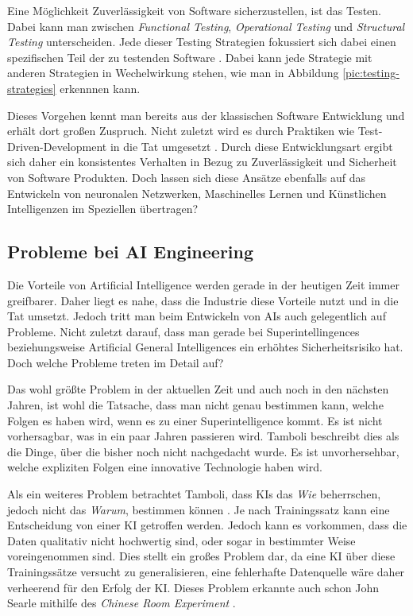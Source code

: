         Eine Möglichkeit Zuverlässigkeit von Software sicherzustellen, ist das Testen. Dabei kann man zwischen
        \textit{Functional Testing}, \textit{Operational Testing} und \textit{Structural Testing} unterscheiden.
        Jede dieser Testing Strategien fokussiert sich dabei einen spezifischen Teil der zu testenden Software
        \cite[s. 26]{bertolino2019}. Dabei kann jede Strategie mit anderen Strategien in Wechelwirkung stehen, wie man
        in Abbildung \ref{pic:testing-strategies} erkennnen kann.

        Dieses Vorgehen kennt man bereits aus der klassischen Software Entwicklung und erhält dort großen Zuspruch.
        Nicht zuletzt wird es durch Praktiken wie Test-Driven-Development in die Tat umgesetzt \cite[s. 403]{Kollanus2010}.
        Durch diese Entwicklungsart ergibt sich daher ein konsistentes Verhalten in Bezug zu Zuverlässigkeit und
        Sicherheit von Software Produkten. Doch lassen sich diese Ansätze ebenfalls auf das Entwickeln von
        neuronalen Netzwerken, Maschinelles Lernen und Künstlichen Intelligenzen im Speziellen übertragen?

        \subsection{Probleme bei AI Engineering}
        Die Vorteile von Artificial Intelligence werden gerade in der heutigen Zeit immer greifbarer. Daher liegt es
        nahe, dass die Industrie diese Vorteile nutzt und in die Tat umsetzt. Jedoch tritt man beim Entwickeln von AIs
        auch gelegentlich auf Probleme. Nicht zuletzt darauf, dass man gerade bei Superintellingences beziehungsweise
        Artificial General Intelligences ein erhöhtes Sicherheitsrisiko hat. Doch welche Probleme treten im Detail auf?

        Das wohl größte Problem in der aktuellen Zeit und auch noch in den nächsten Jahren, ist wohl die Tatsache, dass
        man nicht genau bestimmen kann, welche Folgen es haben wird, wenn es zu einer Superintelligence kommt.
        \cite[s. 21]{Tamboli2019} Es ist nicht vorhersagbar, was in ein paar Jahren passieren wird. Tamboli beschreibt
        dies als die Dinge, über die bisher noch nicht nachgedacht wurde. Es ist unvorhersehbar, welche expliziten Folgen
        eine innovative Technologie haben wird.

        Als ein weiteres Problem betrachtet Tamboli, dass KIs das \textit{Wie} beherrschen, jedoch nicht das
        \textit{Warum}, bestimmen können \cite[s. 24]{Tamboli2019}. Je nach Trainingssatz kann eine Entscheidung von
        einer KI getroffen werden. Jedoch kann es vorkommen, dass die Daten qualitativ nicht hochwertig sind, oder sogar
        in bestimmter Weise voreingenommen sind. Dies stellt ein großes Problem dar, da eine KI über diese Trainingssätze
        versucht zu generalisieren, eine fehlerhafte Datenquelle wäre daher verheerend für den Erfolg der KI. Dieses
        Problem erkannte auch schon John Searle mithilfe des \textit{Chinese Room Experiment} \cite{cole_2014}.

